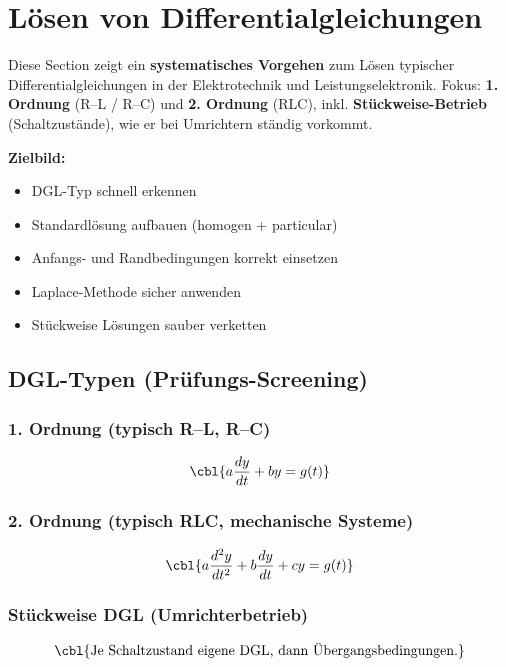 \section{Lösen von Differentialgleichungen}

Diese Section zeigt ein \textbf{systematisches Vorgehen} zum Lösen typischer
Differentialgleichungen in der Elektrotechnik und Leistungselektronik.
Fokus: \textbf{1. Ordnung} (R--L / R--C) und \textbf{2. Ordnung} (RLC),
inkl. \textbf{Stückweise-Betrieb} (Schaltzustände), wie er bei Umrichtern ständig vorkommt.

\smallskip

\textbf{Zielbild:}
\begin{itemize}
    \item DGL-Typ schnell erkennen
    \item Standardlösung aufbauen (homogen + particular)
    \item Anfangs- und Randbedingungen korrekt einsetzen
    \item Laplace-Methode sicher anwenden
    \item Stückweise Lösungen sauber verketten
\end{itemize}

\subsection{DGL-Typen (Prüfungs-Screening)}

\subsubsection{1. Ordnung (typisch R--L, R--C)}

\[
\cbl{a \frac{dy}{dt} + b y = g(t)}
\]

\subsubsection{2. Ordnung (typisch RLC, mechanische Systeme)}

\[
\cbl{a \frac{d^2y}{dt^2} + b \frac{dy}{dt} + c y = g(t)}
\]

\subsubsection{Stückweise DGL (Umrichterbetrieb)}

\[
\cbl{\text{Je Schaltzustand eigene DGL, dann Übergangsbedingungen.}}
\]

